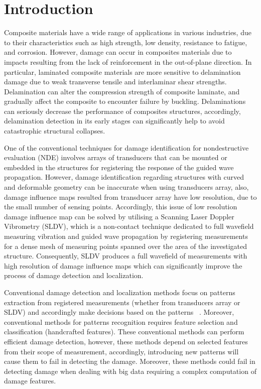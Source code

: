 \documentclass[preprint,9pt]{elsarticle}
\begin{document}
	\section{Introduction}
	Composite materials have a wide range of applications in various industries, due to their characteristics such as high strength, low density, resistance to fatigue, and corrosion.  
	However, damage can occur in composites materials due to impacts resulting from the lack of reinforcement in the out-of-plane direction.
	In particular, laminated composite materials are more sensitive to delamination damage due to weak transverse tensile and interlaminar shear strengths.
	Delamination can alter the compression strength of composite laminate, and gradually affect the composite to encounter failure by buckling. 
	Delaminations can seriously decrease the performance of composites structures, accordingly, delamination detection in its early stages can significantly help to avoid catastrophic structural collapses.
	
	One of the conventional techniques for damage identification for nondestructive evaluation (NDE) involves arrays of transducers that can be mounted or embedded in the structures for registering the response of the guided wave propagation.
	However, damage identification regarding structures with curved and deformable geometry can be inaccurate when using transducers array, also, damage influence maps resulted from transducer array have low resolution, due to the small number of sensing points. 
    Accordingly, this issue of low resolution damage influence map can be solved by utilising a Scanning Laser Doppler Vibrometry (SLDV), which is a non-contact technique dedicated to full wavefield measuring vibration and guided wave propagation by registering measurements for a dense mesh of measuring points spanned over the area of the investigated structure.
    Consequently, SLDV produces a full wavefield of measurements with high resolution of damage influence maps which can significantly improve the process of damage detection and localization. 
    
    Conventional damage detection and localization methods focus on patterns extraction from registered measurements (whether from transducers array or SLDV) and accordingly make decisions based on the patterns ~\cite{Gul2009}. 
    Moreover, conventional methods for patterns recognition requires feature selection and classification (handcrafted features). 
	These conventional methods can perform efficient damage detection, however, these methods depend on selected features from their scope of measurement, accordingly, introducing new patterns will cause them to fail in detecting the damage.
	Moreover, these methods could fail in detecting damage when dealing with big data requiring a complex computation of damage features.
    
\end{document}
